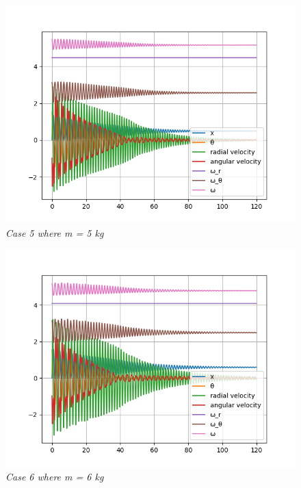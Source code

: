 \begin{figure}[H]
    \centering
    \includegraphics[width=15cm]{ExpPictures/m5.png}
    \caption{\textit{Case 5 where m = 5 kg}}
    \label{}
\end{figure}
        
\begin{figure}[H]
    \centering
    \includegraphics[width=15cm]{ExpPictures/m6.png}
    \caption{\textit{Case 6 where m = 6 kg}}
    \label{}
\end{figure}
        
